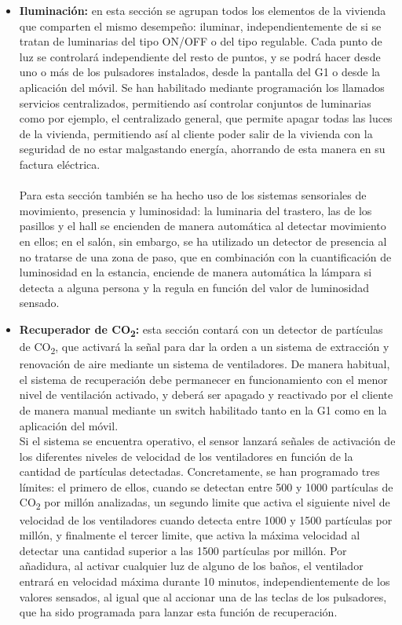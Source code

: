 \begin{itemize}
\item \textbf{Iluminación: }en esta sección se agrupan todos los elementos de la vivienda que comparten el mismo desempeño: iluminar, independientemente de si se tratan de luminarias del tipo ON/OFF o del tipo regulable. Cada punto de luz se controlará independiente del resto de puntos, y se podrá hacer desde uno o más de los pulsadores instalados, desde la pantalla del G1 o desde la aplicación del móvil. Se han habilitado mediante programación los llamados servicios centralizados, permitiendo así controlar conjuntos de luminarias como por ejemplo, el centralizado general, que permite apagar todas las luces de la vivienda, permitiendo así al cliente poder salir de la vivienda con la seguridad de no estar malgastando energía, ahorrando de esta manera en su factura eléctrica. \\\\ Para esta sección también se ha hecho uso de los sistemas sensoriales de movimiento, presencia y luminosidad: la luminaria del trastero, las de los pasillos y el hall se encienden de manera automática al detectar movimiento en ellos; en el salón, sin embargo, se ha utilizado un detector de presencia al no tratarse de una zona de paso, que en combinación con la cuantificación de luminosidad en la estancia, enciende de manera automática la lámpara si detecta a alguna persona y la regula en función del valor de luminosidad sensado.
\item \textbf{Recuperador de CO\textsubscript{2}: }esta sección contará con un detector de partículas de CO\textsubscript{2}, que activará la señal para dar la orden a un sistema de extracción y renovación de aire mediante un sistema de ventiladores. De manera habitual, el sistema de recuperación debe permanecer en funcionamiento con el menor nivel de ventilación activado, y deberá ser apagado y reactivado por el cliente de manera manual mediante un switch habilitado tanto en la G1 como en la aplicación del móvil. \\ 
Si el sistema se encuentra operativo, el sensor lanzará señales de activación de los diferentes niveles de velocidad de los ventiladores en función de la cantidad de partículas detectadas. Concretamente, se han programado tres límites: el primero de ellos, cuando se detectan entre 500 y 1000 partículas de CO\textsubscript{2} por millón analizadas, un segundo limite que activa el siguiente nivel de velocidad de los ventiladores cuando detecta entre 1000 y 1500 partículas por millón, y finalmente el tercer limite, que activa la máxima velocidad al detectar una cantidad superior a las 1500 partículas por millón. Por añadidura, al activar cualquier luz de alguno de los baños, el ventilador entrará en velocidad máxima durante 10 minutos, independientemente de los valores sensados, al igual que al accionar una de las teclas de los pulsadores, que ha sido programada para lanzar esta función de recuperación.

\end{itemize}

